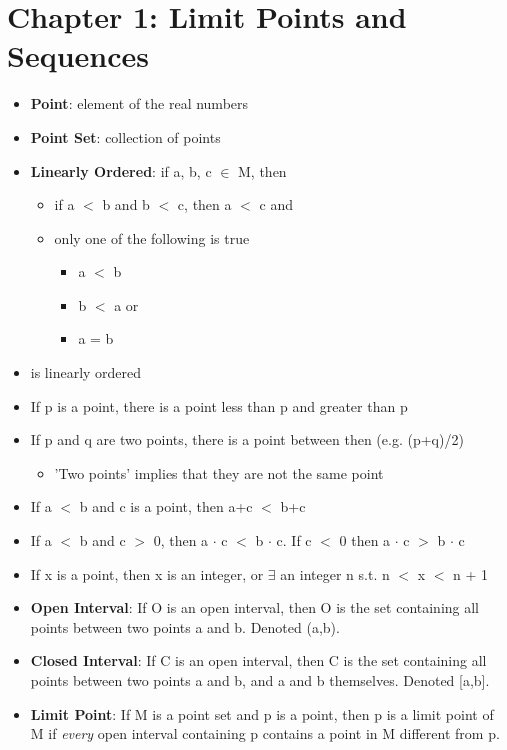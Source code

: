 \documentclass[12pt]{article}
\begin{document}
\section*{Chapter 1: Limit Points and Sequences}

\begin{itemize}
  \item \textbf{Point}: element of the real numbers
  \item \textbf{Point Set}: collection of points
  \item \textbf{Linearly Ordered}: if a, b, c $\in$ M, then
  \begin{itemize}
    \item if a $<$ b and b $<$ c, then a $<$ c and
    \item only one of the following is true
    \begin{itemize}
      \item a $<$ b
      \item b $<$ a or
      \item a = b
    \end{itemize}
  \end{itemize}
  \item {} is linearly ordered
  \item If p is a point, there is a point less than p and greater than p
  \item If p and q are two points, there is a point between then (e.g. (p+q)/2)
  \begin{itemize}
    \item 'Two points' implies that they are not the same point
  \end{itemize}
  \item If a $<$ b and c is a point, then a+c $<$ b+c
  \item If a $<$ b and c $>$ 0, then a $\cdot$ c $<$ b $\cdot$ c. If c $<$ 0 then a $\cdot$ c $>$ b $\cdot$ c
  \item If x is a point, then x is an integer, or $\exists$ an integer n s.t. n $<$ x $<$ n + 1
  \item \textbf{Open Interval}: If O is an open interval, then O is the set containing all points between two points a and b. Denoted (a,b).
  \item \textbf{Closed Interval}: If C is an open interval, then C is the set containing all points between two points a and b, and a and b themselves. Denoted [a,b].
  \item \textbf{Limit Point}: If M is a point set and p is a point, then p is a limit point of M if \textit{every} open interval containing p contains a point in M different from p.
\end{itemize}
\end{document}
